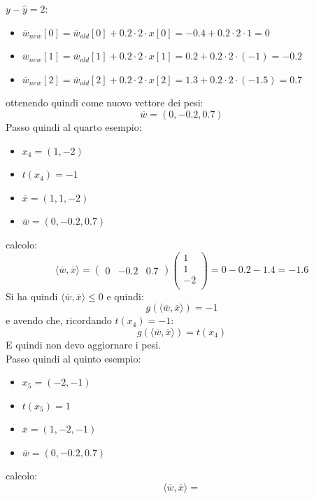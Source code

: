 \begin{esercizio}
						$y-\hat{y}=2$:
						\begin{itemize}
							\item
							      $\overline{w}_{new}[0]=\overline{w}_{old}[0]+0.2\cdot 2\cdot
							      x[0]=-0.4+0.2\cdot 2\cdot 1=0$ 
							\item
							      $\overline{w}_{new}[1]=\overline{w}_{old}[1]+0.2\cdot 2\cdot
							      x[1]=0.2+0.2\cdot 2\cdot (-1)=-0.2$ 
							\item
							      $\overline{w}_{new}[2]=\overline{w}_{old}[2]+0.2\cdot 2\cdot x[2]=1.3+0.2
							      \cdot 2\cdot(-1.5)=0.7$    
						\end{itemize}
						ottenendo quindi come nuovo vettore dei pesi:
						\[\overline{w}=(0, -0.2, 0.7)\]
						Passo quindi al quarto esempio:
						\begin{itemize}
							\item $x_4=(1,-2)$
							\item $t(x_4)=-1$
							\item $\overline{x}=(1, 1,-2)$
							\item $\overline{w}=(0, -0.2, 0.7)$
						\end{itemize}
						calcolo:
						\[\langle \overline{w}, \overline{x}\rangle=
							\left(\begin{matrix}
							0 & -0.2 & 0.7
							\end{matrix}\right)
							\left(
							\begin{matrix}
								1  \\
								1  \\
								-2 \\
							\end{matrix}
							\right)= 0-0.2-1.4 = -1.6
						\]
						Si ha quindi $\langle \overline{w}, \overline{x}\rangle \leq 0$ e quindi:
						\[g(\langle \overline{w}, \overline{x}\rangle)=-1\]
						e avendo che, ricordando $t(x_4)=-1$:
						\[g(\langle \overline{w}, \overline{x}\rangle)= t(x_4)\]
						E quindi non devo aggiornare i pesi.\\
						Passo quindi al quinto esempio:
						\begin{itemize}
							\item $x_5=(-2,-1)$
							\item $t(x_5)=1$
							\item $\overline{x}=(1,-2,-1)$
							\item $\overline{w}=(0, -0.2, 0.7)$
						\end{itemize}
						calcolo:
						\[\langle \overline{w}, \overline{x}\rangle=
\]
\end{esercizio}
